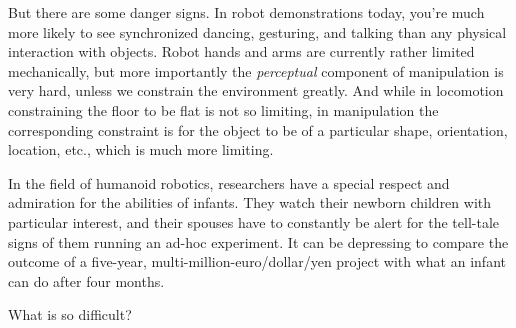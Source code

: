 But there are some danger signs.  In robot demonstrations today,
you're much more likely to see synchronized dancing, gesturing, and
talking than any physical interaction with objects.  Robot hands and
arms are currently rather limited mechanically, but more importantly
the {\em perceptual} component of manipulation is very hard, unless we
constrain the environment greatly.  And while in locomotion
constraining the floor to be flat is not so limiting, in manipulation
the corresponding constraint is for the object to be of a particular
shape, orientation, location, etc., which is much more limiting.

In the field of humanoid robotics, researchers have a special respect
and admiration for the abilities of infants.  They watch their newborn
children with particular interest, and their spouses have to
constantly be alert for the tell-tale signs of them running an ad-hoc
experiment.  It can be depressing to compare the outcome of a 
five-year, multi-million-euro/dollar/yen project with what an
infant can do after four months.

What is so difficult?  


